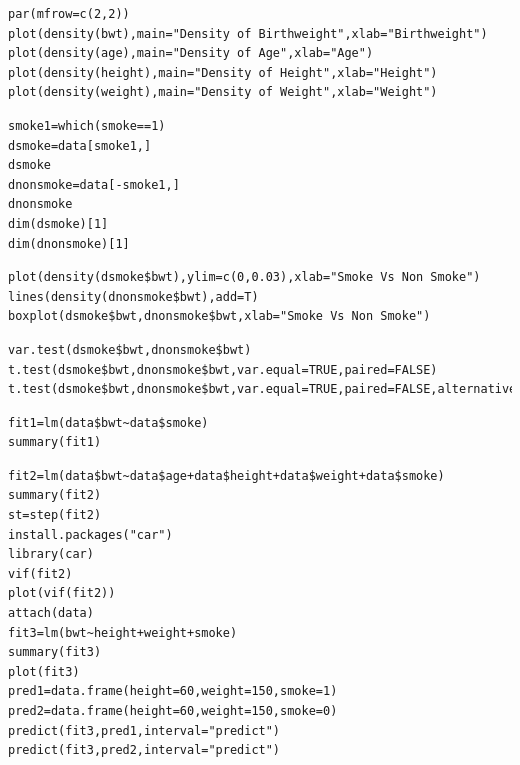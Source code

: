 \documentclass[oneside,12pt]{report}
\begin{document}
\begin{lstlisting}
par(mfrow=c(2,2))
plot(density(bwt),main="Density of Birthweight",xlab="Birthweight")
plot(density(age),main="Density of Age",xlab="Age")
plot(density(height),main="Density of Height",xlab="Height")
plot(density(weight),main="Density of Weight",xlab="Weight")
\end{lstlisting}

\begin{lstlisting}
smoke1=which(smoke==1)
dsmoke=data[smoke1,]
dsmoke
dnonsmoke=data[-smoke1,]
dnonsmoke
dim(dsmoke)[1]
dim(dnonsmoke)[1]
\end{lstlisting}

\begin{lstlisting}
plot(density(dsmoke$bwt),ylim=c(0,0.03),xlab="Smoke Vs Non Smoke")
lines(density(dnonsmoke$bwt),add=T)
boxplot(dsmoke$bwt,dnonsmoke$bwt,xlab="Smoke Vs Non Smoke")
\end{lstlisting}

\begin{lstlisting}
var.test(dsmoke$bwt,dnonsmoke$bwt)
t.test(dsmoke$bwt,dnonsmoke$bwt,var.equal=TRUE,paired=FALSE)
t.test(dsmoke$bwt,dnonsmoke$bwt,var.equal=TRUE,paired=FALSE,alternative="less")
\end{lstlisting}

\begin{lstlisting}
fit1=lm(data$bwt~data$smoke)
summary(fit1)
\end{lstlisting}

\begin{lstlisting}
fit2=lm(data$bwt~data$age+data$height+data$weight+data$smoke)
summary(fit2)
st=step(fit2)
install.packages("car")
library(car)
vif(fit2)
plot(vif(fit2))
attach(data)
fit3=lm(bwt~height+weight+smoke)
summary(fit3)
plot(fit3)
pred1=data.frame(height=60,weight=150,smoke=1)
pred2=data.frame(height=60,weight=150,smoke=0)
predict(fit3,pred1,interval="predict")
predict(fit3,pred2,interval="predict")
\end{lstlisting}





\renewcommand\bibname{Selected Bibliography Including Cited Works}
\nocite{*}  %

\end{document}
